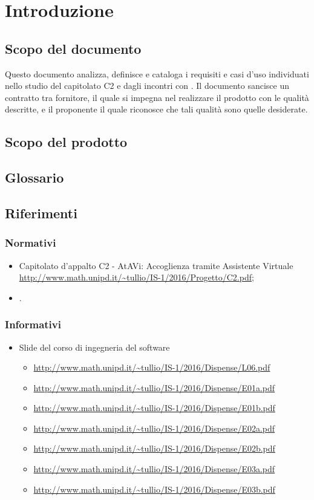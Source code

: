 \section{Introduzione}
 \subsection{Scopo del documento}
 Questo documento analizza, definisce e cataloga i requisiti e casi d'uso individuati nello studio del capitolato C2 e dagli incontri con \PROPONENTE. 
 Il documento sancisce un contratto tra fornitore, il quale si impegna nel realizzare il prodotto con le qualità descritte,  e il proponente il quale riconosce che tali qualità sono quelle desiderate. 
 \subsection{Scopo del prodotto}
 \SCOPO
 \subsection{Glossario}
 \GLOSSARIO
 \subsection{Riferimenti}
  \subsubsection{Normativi}
  \begin{itemize}
  	\item Capitolato d'appalto C2 - AtAVi: Accoglienza tramite Assistente Virtuale \\
  	\url{http://www.math.unipd.it/~tullio/IS-1/2016/Progetto/C2.pdf};
    \item \NPdoc.
  \end{itemize}
  \subsubsection{Informativi}
    \begin{itemize}
    	\item Slide del corso di ingegneria del software
    	\begin{itemize}
    		\item \url{http://www.math.unipd.it/~tullio/IS-1/2016/Dispense/L06.pdf}
    		\item \url{http://www.math.unipd.it/~tullio/IS-1/2016/Dispense/E01a.pdf}
    		\item \url{http://www.math.unipd.it/~tullio/IS-1/2016/Dispense/E01b.pdf}
    		\item \url{http://www.math.unipd.it/~tullio/IS-1/2016/Dispense/E02a.pdf}
    		\item \url{http://www.math.unipd.it/~tullio/IS-1/2016/Dispense/E02b.pdf}
    		\item \url{http://www.math.unipd.it/~tullio/IS-1/2016/Dispense/E03a.pdf}
    		\item \url{http://www.math.unipd.it/~tullio/IS-1/2016/Dispense/E03b.pdf}
    	\end{itemize}
    \end{itemize}